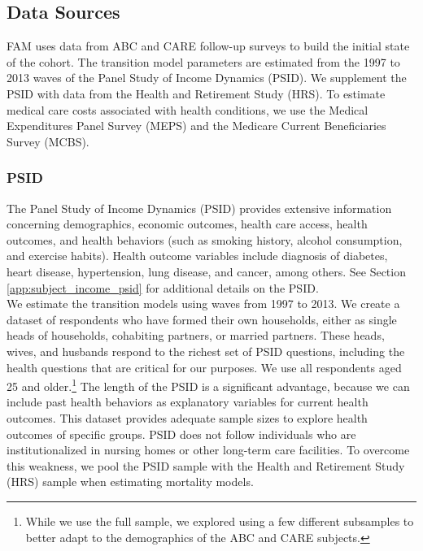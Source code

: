 \subsection{Data Sources} \label{section:data}
\noindent FAM uses data from ABC and CARE follow-up surveys to build the initial state of the cohort. 
The transition model parameters are estimated from the 1997 to 2013 waves of the Panel Study of Income Dynamics (PSID). 
We supplement the PSID with data from the Health and Retirement Study (HRS). 
To estimate medical care costs associated with health conditions, we use the Medical Expenditures Panel Survey (MEPS) and the Medicare Current Beneficiaries Survey (MCBS). \\

\subsubsection{PSID}
\label{section:data_psid}

\noindent The Panel Study  of Income Dynamics (PSID) provides extensive information concerning demographics, economic outcomes, health care access, health outcomes, and health behaviors (such as smoking history, alcohol consumption, and exercise habits). Health outcome variables include diagnosis of diabetes, heart disease, hypertension, lung disease, and cancer, among others. See Section \ref{app:subject_income_psid} for additional details on the PSID. \\

\noindent We estimate the transition models using waves from 1997 to 2013. We create a dataset of respondents who have formed their own households, either
as single heads of households, cohabiting partners, or married partners.  These heads, wives, and husbands respond to the richest
set of PSID questions, including the health questions that are critical for our purposes. We use all respondents aged 25 and older.\footnote{While we use the full sample, we explored using a few different subsamples to better adapt to the demographics of the ABC and CARE subjects.}  
The length of the PSID is a significant advantage, because we can include past health behaviors as explanatory variables for current health outcomes. This dataset provides adequate sample sizes to explore health outcomes of specific groups. 
PSID does not follow individuals who are institutionalized in nursing homes or other long-term care facilities. To overcome this weakness, we pool the PSID sample with the Health and Retirement Study (HRS) sample when
estimating mortality models. \\


